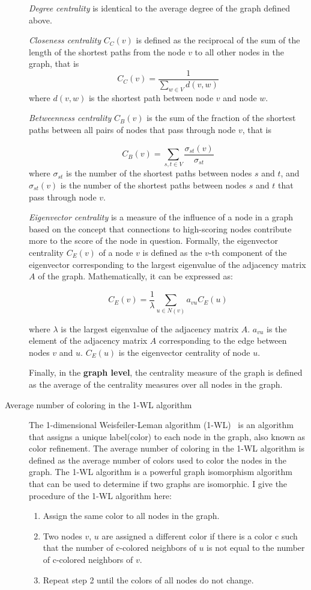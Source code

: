 \begin{description}
    \textit{Degree centrality} is identical to the average degree of the graph defined above. 
    
    \textit{Closeness centrality} $C_C(v)$ is defined as the reciprocal of the sum of the length of the shortest paths from the node $v$ to all other nodes in the graph, that is 
    $$C_C(v) = \frac{1}{\sum_{w\in V}{d(v ,w)}}$$
    where $d(v, w)$ is the shortest path between node $v$ and node $w$. 
    
    \textit{Betweenness centrality} $C_B(v)$ is the sum of the fraction of the shortest paths between all pairs of nodes that pass through node $v$, that is
    
    $$
        C_B(v) = \sum_{s,t \in V} \frac{\sigma_{st}(v)}{\sigma_{st}}
    $$
    where $\sigma_{st}$ is the number of the shortest paths between nodes $s$ and $t$, and $\sigma_{st}(v)$ is the number of the shortest paths between nodes $s$ and $t$ that pass through node $v$.
    
    \textit{Eigenvector centrality} is a measure of the influence of a node in a graph based on the concept that connections to high-scoring nodes contribute more to the score of the node in question. Formally, the eigenvector centrality $C_E(v)$ of a node $v$  is defined as the $v$-th component of the eigenvector corresponding to the largest eigenvalue of the adjacency matrix $A$ of the graph. Mathematically, it can be expressed as:
    
    \[ C_E(v) = \frac{1}{\lambda} \sum_{u \in N(v)} a_{vu} C_E(u) \]
    
    where $ \lambda$ is the largest eigenvalue of the adjacency matrix $A$.
$a_{vu}$ is the element of the adjacency matrix $A$ corresponding to the edge between nodes $v$  and $u$.
$ C_E(u)$  is the eigenvector centrality of node $u$.


    Finally, in the \textbf{graph level}, the centrality measure of the graph is defined as the average of the centrality measures over all nodes in the graph.

    \item [Average number of coloring in the 1-WL algorithm] 
    \sloppy
    The 1-dimensional Weisfeiler-Leman algorithm (1-WL)~\cite{weisfeiler1968reduction} is an algorithm that assigns a unique label(color) to each node in the graph, also known as color refinement. The average number of coloring in the 1-WL algorithm is defined as the average number of colors used to color the nodes in the graph. The 1-WL algorithm is a powerful graph isomorphism algorithm that can be used to determine if two graphs are isomorphic. I give the procedure of the 1-WL algorithm here:
    \begin{enumerate}
        \item Assign the same color to all nodes in the graph.
        \item Two nodes $v$, $u$ are assigned a different color if there is a color c such that the number of c-colored neighbors of $u$ is not equal to the number of c-colored neighbors of $v$.
        \item Repeat step 2 until the colors of all nodes do not change.
    \end{enumerate}
    
\end{description}